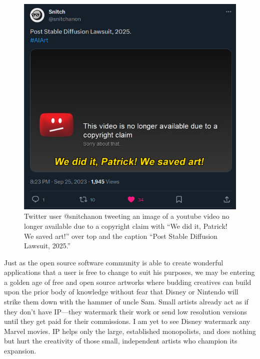 \documentclass[11pt]{article}
\begin{document}
\begin{figure}[htbp]
\centering
\includegraphics[width=.9\linewidth]{./images/copyright strike IP AI art we did it patrick we saved art.png}
\caption{Twitter user @snitchanon tweeting an image of a youtube video no longer available due to a copyright claim with ``We did it, Patrick! We saved art!'' over top and the caption ``Post Stable Diffusion Lawsuit, 2025.''}
\end{figure}

Just as the open source software community is able to create wonderful applications that a user is free to change to suit his purposes, we may be entering a golden age of free and open source artworks where budding creatives can build upon the prior body of knowledge without fear that Disney or Nintendo will strike them down with the hammer of uncle Sam. Small artists already act as if they don't have IP---they watermark their work or send low resolution versions until they get paid for their commissions. I am yet to see Disney watermark any Marvel movies. IP helps only the large, established monopolists, and does nothing but hurt the creativity of those small, independent artists who champion its expansion.
\end{document}
